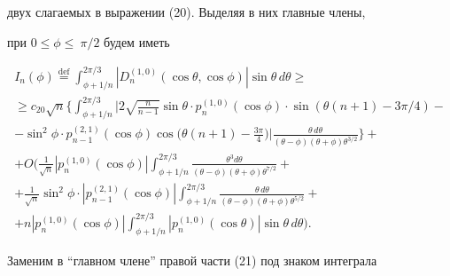 двух слагаемых в выражении (20). Выделяя в них главные члены,


при $0\le\phi\le\ \pi /2$ будем иметь


\begin{multline}


I_n(\phi)\overset{\mathrm{def}}{=}{}\int_{\phi+{1}/{n}}^{{2\pi}/{3}}


|D_n^{(1,0)}(\cos\theta,\cos\phi)|\sin\theta\, d\theta \ge\\


%


\ge c_{20} \sqrt {n}\bigg\{\int_{\phi +{1}/{n}}^{{2\pi}/{3}}


\bigg|2\sqrt{\frac{n}{n-1}}\sin \theta\cdot p_n^{(1,0)}(\cos\phi)\cdot


\sin(\theta(n+1)-3\pi/4)- \\


%


-\sin^2\phi\cdot p_{n-1}^{(2,1)}(\cos \phi)\cos\bigg(\theta(n+1)-


\frac{3\pi}{4}\bigg)\bigg|


\frac{\theta\, d\theta}{(\theta-\phi)(\theta+\phi)\theta^


{{3}/{2}}}\bigg\}+ \\


%


+O\bigg(\frac{1}{\sqrt n}|p_n^{(1,0)}(\cos\phi)|


\int_{\phi+{1}/{n}}^{ {2\pi}/{3}}


\frac{\theta^3 d\theta}{(\theta-\phi)(\theta+\phi)\theta^


{{7}/{2}}}+ \\


%


+\frac{1}{\sqrt n}\sin^2\phi \cdot |p_{n-1}^{(2,1)}(\cos\phi)|


\int_{\phi+{1}/{n}}^{{2\pi}/{3}}


\frac{\theta\, d\theta}{(\theta-\phi)(\theta+\phi)\theta^


{{5}/{2}}}+ \\


%


+n|p_n^{(1,0)}(\cos\phi)|\int_{\phi+{1}/{n}}^{ {2\pi}/{3}}


|p_n^{(1,0)}(\cos \theta)|\sin\theta\, d\theta\bigg).


\end{multline}


Заменим в ``главном члене'' правой части (21) под знаком интеграла


